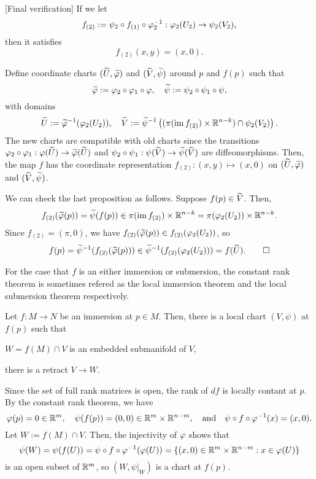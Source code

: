 \documentclass{../exp}
\begin{document}
\begin{pf}
[Final verification]
If we let
\[f_{(2)}:=\psi_2\o f_{(1)}\o\f_2^{-1}:\f_2(U_2)\to\psi_2(V_2),\]
then it satisfies
\[f_{(2)}(x,y)=(x,0).\]

Define coordinate charts $(\widetilde U,\widetilde{\varphi})$ and $(\widetilde V,\widetilde\psi)$ around $p$ and $f(p)$ such that
\[\tld\f:=\f_2\o\f_1\o\f,\quad\tld\psi:=\psi_2\o\psi_1\o\psi,\]
with domains
\[\widetilde U:=\widetilde{\varphi}^{-1}(\varphi_2(U_2)),\quad\widetilde V:=\widetilde\psi^{-1}\left((\pi(\operatorname{im} f_{(2)})\times\mathbb{R}^{n-k})\cap\psi_2(V_2)\right).\]
The new charts are compatible with old charts since the transitions $\f_2\o\f_1:\f(\tld U)\to\tld\f(\tld U)$ and $\psi_2\o\psi_1:\psi(\tld V)\to\tld\psi(\tld V)$ are diffeomorphisms.
Then, the map $f$ has the coordinate representation $f_{(2)}:(x,y)\mapsto(x,0)$ on $(\widetilde U,\widetilde{\varphi})$ and $(\widetilde V,\widetilde\psi)$.

We can check the last proposition as follows.
Suppose $f(p)\in\widetilde V$.
Then,
\[f_{(2)}(\widetilde{\varphi}(p))=\widetilde\psi(f(p))\in\pi(\operatorname{im} f_{(2)})\times\mathbb{R}^{n-k}=\pi(\varphi_2(U_2))\times\mathbb{R}^{n-k}.\]
Since $f_{(2)}=(\pi,0)$, we have $f_{(2)}(\widetilde{\varphi}(p))\in f_{(2)}(\varphi_2(U_2))$, so
\[f(p)=\widetilde\psi^{-1}(f_{(2)}(\widetilde{\varphi}(p)))\in\widetilde\psi^{-1}(f_{(2)}(\varphi_2(U_2)))=f(\widetilde U).\qedhere\]
\end{pf}
For the case that $f$ is an either immersion or submersion, the constant rank theorem is sometimes refered as the local immersion theorem and the local submersion theorem respectively.

\begin{cor}
Let $f:M\to N$ be an immersion at $p\in M$.
Then, there is a local chart $(V,\psi)$ at $f(p)$ such that
\begin{cond}
\item $W=f(M)\cap V$ is an embedded submanifold of $V$,
\item there is a retract $V\to W$.
\end{cond}
\end{cor}
\begin{pf}
Since the set of full rank matrices is open, the rank of $df$ is locally contant at $p$.
By the constant rank theorem, we have
\[\f(p)=0\in\R^m,\quad\psi(f(p))=(0,0)\in\R^m\x\R^{n-m},\quad\text{and}\quad\psi\o f\o\f^{-1}(x)=(x,0).\]
Let $W:=f(M)\cap V$.
Then, the injectivity of $\varphi$ shows that
\[\psi(W)=\psi(f(U))=\psi\o f\o\f^{-1}(\f(U))=\{(x,0)\in\R^m\x\R^{n-m}:x\in\f(U)\}\]
is an open subset of $\mathbb{R}^m$, so $(W,\psi|_W)$ is a chart at $f(p)$.
\end{pf}
\end{document}

